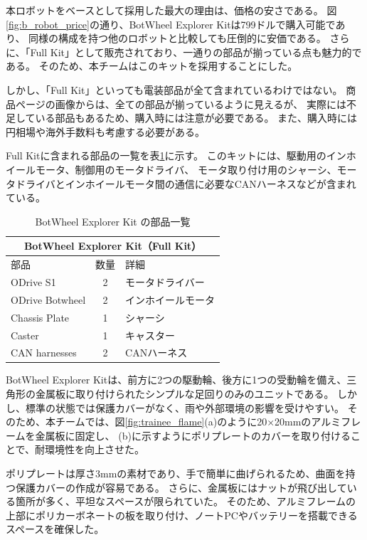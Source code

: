 \documentclass[twocolumn,9pt]{jsproceedings}
\begin{document}
本ロボットをベースとして採用した最大の理由は、価格の安さである。
図\ref{fig:b_robot_price}の通り、BotWheel Explorer Kitは799ドルで購入可能であり、
同様の構成を持つ他のロボットと比較しても圧倒的に安価である。
さらに、「Full Kit」として販売されており、一通りの部品が揃っている点も魅力的である。
そのため、本チームはこのキットを採用することにした。

しかし、「Full Kit」といっても電装部品が全て含まれているわけではない。
商品ページの画像からは、全ての部品が揃っているように見えるが、
実際には不足している部品もあるため、購入時には注意が必要である。
また、購入時には円相場や海外手数料も考慮する必要がある。

Full Kitに含まれる部品の一覧を表\ref{tab:botwheel_kit}に示す。
このキットには、駆動用のインホイールモータ、制御用のモータドライバ、
モータ取り付け用のシャーシ、モータドライバとインホイールモータ間の通信に必要なCANハーネスなどが含まれている。
\begin{table}[h]
  \centering
  \begin{tabular}{|l|c|l|}
      \hline
      \multicolumn{3}{|c|}{\textbf{BotWheel Explorer Kit（Full Kit）}} \\
      \hline
      部品 & 数量 & 詳細 \\
      \hline
      ODrive S1 & 2 & モータドライバー \\
      ODrive Botwheel & 2 & インホイールモータ \\
      Chassis Plate & 1 & シャーシ \\
      Caster & 1 & キャスター \\
      CAN harnesses & 2 & CANハーネス \\
      \hline
  \end{tabular}
  \caption{BotWheel Explorer Kit の部品一覧}
  \label{tab:botwheel_kit}
\end{table}


BotWheel Explorer Kitは、前方に2つの駆動輪、後方に1つの受動輪を備え、三角形の金属板に取り付けられたシンプルな足回りのみのユニットである。
しかし、標準の状態では保護カバーがなく、雨や外部環境の影響を受けやすい。
そのため、本チームでは、図\ref{fig:trainee_flame}(a)のように20×20mmのアルミフレームを金属板に固定し、
(b)に示すようにポリプレートのカバーを取り付けることで、耐環境性を向上させた。

ポリプレートは厚さ3mmの素材であり、手で簡単に曲げられるため、曲面を持つ保護カバーの作成が容易である。
さらに、金属板にはナットが飛び出している箇所が多く、平坦なスペースが限られていた。
そのため、アルミフレームの上部にポリカーボネートの板を取り付け、ノートPCやバッテリーを搭載できるスペースを確保した。
\end{document}
